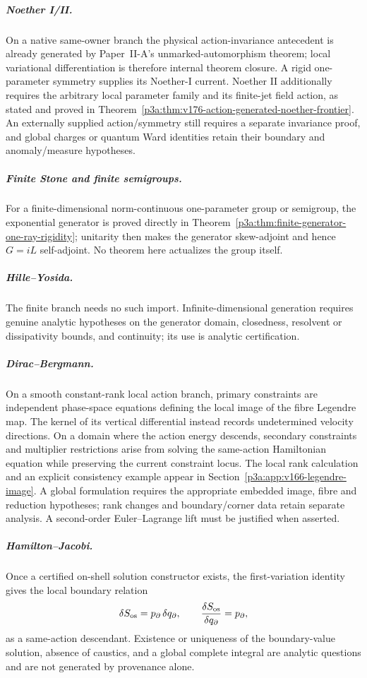 \documentclass[11pt,a4paper]{article}
\begin{document}
\subparagraph{Noether I/II.}
On a native same-owner branch the physical action-invariance antecedent is
already generated by Paper~II-A's unmarked-automorphism theorem; local
variational differentiation is therefore internal theorem closure. A rigid
one-parameter symmetry supplies its Noether-I current. Noether II additionally
requires the arbitrary local parameter family and its finite-jet field action,
as stated and proved in
Theorem~\ref{p3a:thm:v176-action-generated-noether-frontier}. An
externally supplied action/symmetry still requires a separate invariance proof,
and global charges or quantum Ward identities retain their boundary and
anomaly/measure hypotheses.

\subparagraph{Finite Stone and finite semigroups.}
For a finite-dimensional norm-continuous one-parameter group or semigroup, the
exponential generator is proved directly in
Theorem~\ref{p3a:thm:finite-generator-one-ray-rigidity}; unitarity then makes
the generator skew-adjoint and hence \(G=iL\) self-adjoint.  No theorem here
actualizes the group itself.

\subparagraph{Hille--Yosida.}
The finite branch needs no such import.  Infinite-dimensional generation
requires genuine analytic hypotheses on the generator domain, closedness,
resolvent or dissipativity bounds, and continuity; its use is analytic
certification.

\subparagraph{Dirac--Bergmann.}
On a smooth constant-rank local action branch, primary constraints are
independent phase-space equations defining the local image of the fibre
Legendre map. The kernel of its vertical differential instead records
undetermined velocity directions. On a domain where the action energy
descends, secondary constraints and multiplier restrictions arise from
solving the same-action Hamiltonian equation while preserving the current
constraint locus. The local rank calculation and an explicit consistency
example appear in Section~\ref{p3a:app:v166-legendre-image}.
A global formulation requires the appropriate embedded image, fibre and
reduction hypotheses; rank changes and boundary/corner data retain separate
analysis. A second-order Euler--Lagrange lift must be justified when asserted.

\subparagraph{Hamilton--Jacobi.}
Once a certified on-shell solution constructor exists, the first-variation
identity gives the local boundary relation
\[
 \delta S_{\rm os}=p_{\partial}\,\delta q_{\partial},
 \qquad
 \frac{\delta S_{\rm os}}{\delta q_{\partial}}=p_{\partial},
\]
as a same-action descendant.  Existence or uniqueness of the boundary-value
solution, absence of caustics, and a global complete integral are analytic
questions and are not generated by provenance alone.
\end{document}

